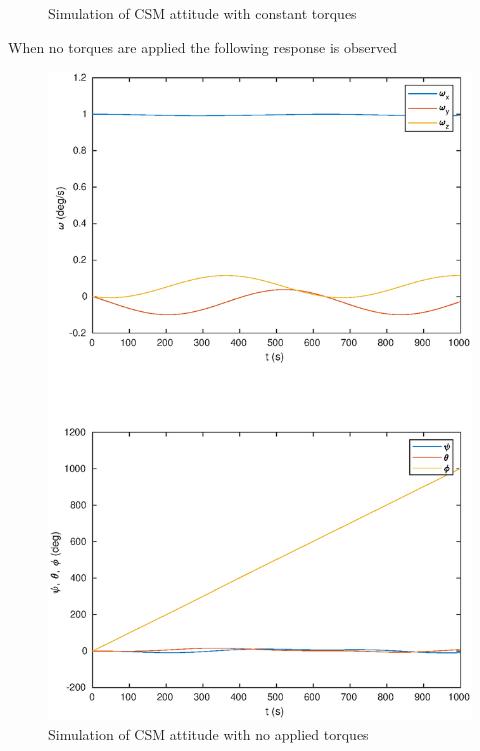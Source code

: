 \documentclass[a4paper]{article}
\begin{document}
\begin{enumerate}[a.]
\begin{figure}[H]
\begin{center}
    \end{center}
    \caption{Simulation of CSM attitude with constant torques}
    \label{fig:task_c_torques}
    \end{figure}

    When no torques are applied the following response is observed
    \begin{figure}[H]
    \begin{center}
      \includegraphics[scale=0.7]{task_c_no_torques.eps}
    \end{center}
    \caption{Simulation of CSM attitude with no applied torques}
    \label{fig:task_c_no_torques}
    \end{figure}


\end{enumerate}
\end{document}
